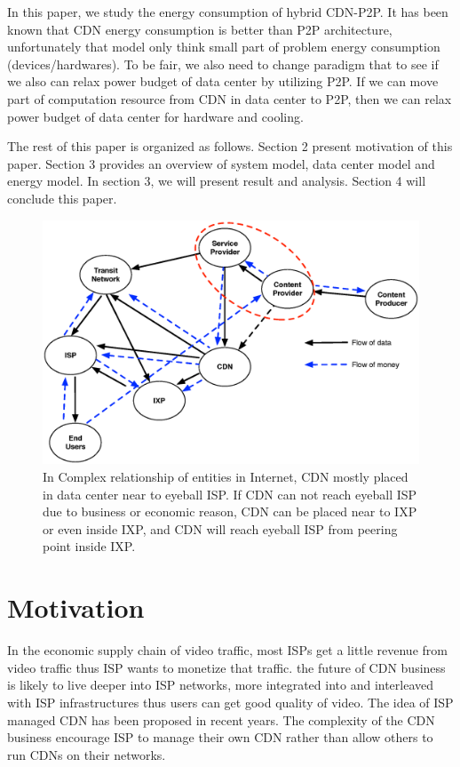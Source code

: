 \documentclass[JIP]{ipsj}
\begin{document}
In this paper, we study the energy consumption of hybrid CDN-P2P.  
It has been known that CDN energy consumption is better than P2P architecture, unfortunately that model only think small part of problem energy consumption (devices/hardwares).
To be fair, we also need to change paradigm that to see if we also can relax power budget of data center by utilizing P2P.   
If we can move part of computation resource from CDN in data center to P2P, then we can relax power budget of data center for hardware and cooling. 

The rest of this paper is organized as follows. 
Section 2 present motivation of this paper.
Section 3 provides an overview of system model, data center model and energy model.  
In section 3, we will present result and analysis.  
Section 4 will conclude this paper. 

\begin{figure}[tb]
\begin{center}
\includegraphics[scale=0.4]{graphs/business-relationship.eps}
\end{center}
\caption{In Complex relationship of entities in Internet, 
CDN mostly placed in data center near to eyeball ISP. 
If CDN can not reach eyeball ISP due to business or economic reason, CDN can be placed near to IXP or even inside IXP, and CDN will reach eyeball ISP from peering point inside IXP.}
\label{fig:businessrelationship}
\vspace{-2mm}
\end{figure} 

\section{Motivation}\label{motivation}
In the economic supply chain of video traffic, most ISPs get a little revenue from video traffic thus ISP wants to monetize that traffic.
the future of CDN business is likely to live deeper into ISP networks, more integrated into and interleaved with ISP infrastructures thus users can get good quality of video.
The idea of ISP managed CDN has been proposed in recent years.
The complexity of the CDN business encourage ISP to manage their own CDN rather than allow others to run CDNs on their networks.
\end{document}
